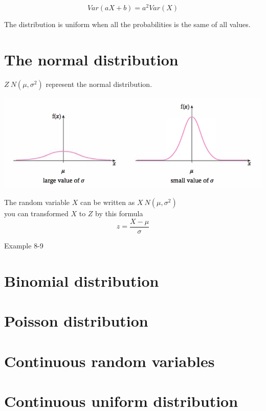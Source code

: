 \documentclass[a4paper]{article}
\begin{document}
\[
	Var(aX+b)=a^2Var(X)
\]
\begin{defi}
	The distribution is uniform when all the probabilities is the same of all values.
\end{defi}


\section{The normal distribution}
$Z~ N(\mu,\sigma^2)$ represent the normal distribution.\\

\begin{center}
	\includegraphics[scale=0.5]{img_S/8_intro}
\end{center}

The random variable $X$ can be written as $X~ N(\mu,\sigma^2)$\\

you can transformed $X$ to $Z$ by this formula
\[
	z=\frac{X-\mu}{\sigma}
\]
\begin{eg}
    Example 8-9
\end{eg}

\section{Binomial distribution}

\section{Poisson distribution}

\section{Continuous random variables}

\section{Continuous uniform distribution}
\end{document}
